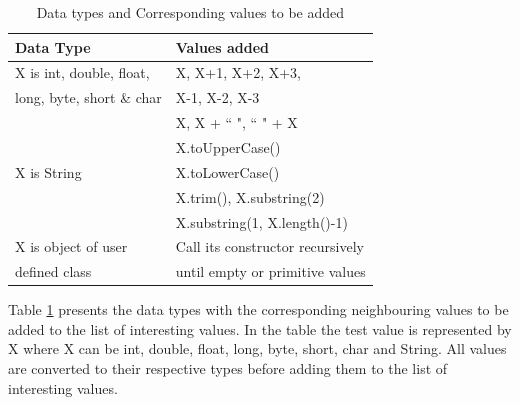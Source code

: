 \documentclass[conference]{IEEEtran}
\begin{document}


\begin{table}[ht]
\caption{Data types and Corresponding values to be added} %
\centering %
{\renewcommand{\arraystretch}{1.1}
\begin{tabular}{| l | l |} %
\hline %
Data Type & Values added\\ [0.5ex] %
\hline %
\multirow{1}{*}{X is int, double, float, } & X,  X+1, X+2, X+3,  \\ %
\multirow{1}{*}{long, byte, short \& char} & X-1, X-2, X-3 \\ 

\hline
\multirow{5}{*}{X is String} & X, X + ``  ", ``  " + X \\ %
& X.toUpperCase() \\
& X.toLowerCase() \\
& X.trim(), X.substring(2) \\
& X.substring(1, X.length()-1) \\
\hline
\multirow{1}{*}{X is object of user} & Call its constructor recursively \\ %
\multirow{1}{*}{defined class} & until empty or primitive values \\[1ex]
\hline %
\end{tabular}
}
\bigskip
\label{table:addvalues} %
\end{table}





Table \ref{table:addvalues} presents the data types with the corresponding neighbouring values to be added to the list of interesting values. In the table the test value is represented by X where X can be int, double, float, long, byte, short, char and String. All values are converted to their respective types before adding them to the list of interesting values.
\end{document}
